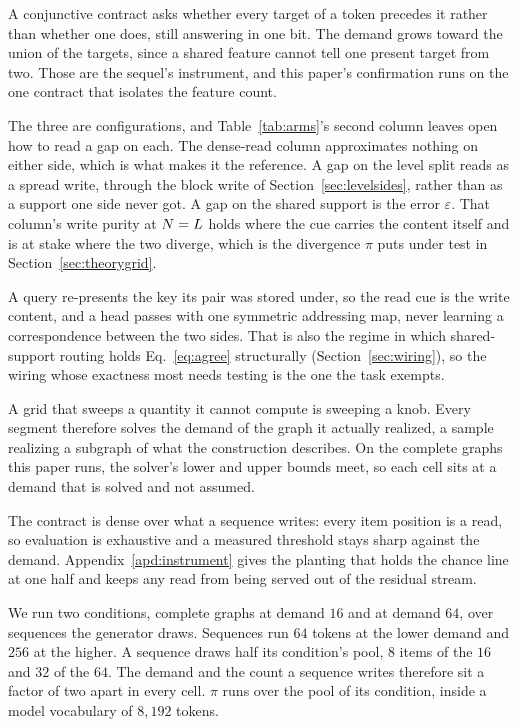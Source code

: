 A conjunctive contract asks whether every target of a token precedes it rather than whether one does, still answering in one bit. The demand grows toward the union of the targets, since a shared feature cannot tell one present target from two. Those are the sequel's instrument, and this paper's confirmation runs on the one contract that isolates the feature count.

The three are configurations, and Table~\ref{tab:arms}'s second column leaves open how to read a gap on each. The dense-read column approximates nothing on either side, which is what makes it the reference. A gap on the level split reads as a spread write, through the block write of Section~\ref{sec:levelsides}, rather than as a support one side never got. A gap on the shared support is the error $\varepsilon$. That column's write purity at $N = L$ holds where the cue carries the content itself and is at stake where the two diverge, which is the divergence $\pi$ puts under test in Section~\ref{sec:theorygrid}.

A query re-presents the key its pair was stored under, so the read cue is the write content, and a head passes with one symmetric addressing map, never learning a correspondence between the two sides. That is also the regime in which shared-support routing holds Eq.~\eqref{eq:agree} structurally (Section~\ref{sec:wiring}), so the wiring whose exactness most needs testing is the one the task exempts.

A grid that sweeps a quantity it cannot compute is sweeping a knob. Every segment therefore solves the demand of the graph it actually realized, a sample realizing a subgraph of what the construction describes. On the complete graphs this paper runs, the solver's lower and upper bounds meet, so each cell sits at a demand that is solved and not assumed.

The contract is dense over what a sequence writes: every item position is a read, so evaluation is exhaustive and a measured threshold stays sharp against the demand. Appendix~\ref{apd:instrument} gives the planting that holds the chance line at one half and keeps any read from being served out of the residual stream.

We run two conditions, complete graphs at demand $16$ and at demand $64$, over sequences the generator draws. Sequences run $64$ tokens at the lower demand and $256$ at the higher. A sequence draws half its condition's pool, $8$ items of the $16$ and $32$ of the $64$. The demand and the count a sequence writes therefore sit a factor of two apart in every cell. $\pi$ runs over the pool of its condition, inside a model vocabulary of $8{,}192$ tokens.

